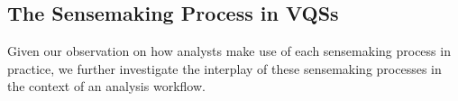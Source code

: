 \subsection{The Sensemaking Process in VQSs}
Given our observation on how analysts make use of each sensemaking process in practice, we further investigate the interplay of these sensemaking processes in the context of an analysis workflow. %

